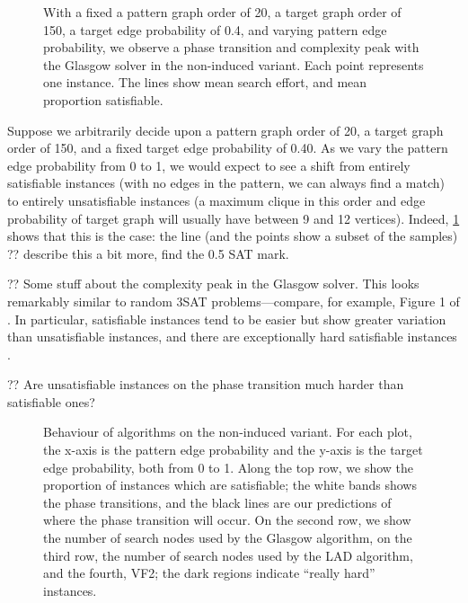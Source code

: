 \documentclass[letterpaper]{article}
\begin{document}
\begin{figure}[tb]
    \setlength{\abovecaptionskip}{6pt}
    
    \caption{With a fixed a pattern graph order of 20, a target graph order of 150, a target edge
        probability of 0.4, and varying pattern edge probability, we observe a phase transition and
        complexity peak with the Glasgow solver in the non-induced variant. Each point represents
        one instance. The lines show mean search effort, and mean proportion satisfiable.}
    \label{figure:phase-transition}
\end{figure}

Suppose we arbitrarily decide upon a pattern graph order of 20, a target graph order of 150, and a
fixed target edge probability of 0.40. As we vary the pattern edge probability from 0 to 1, we would
expect to see a shift from entirely satisfiable instances (with no edges in the pattern, we can
always find a match) to entirely unsatisfiable instances (a maximum clique in this order and edge
probability of target graph will usually have between 9 and 12 vertices). Indeed,
\cref{figure:phase-transition} shows that this is the case: the line (and the points show a subset
of the samples) ?? describe this a bit more, find the 0.5 SAT mark.

?? Some stuff about the complexity peak in the Glasgow solver. This looks remarkably similar to random
3SAT problems---compare, for example, Figure 1 of \citet{LeytonBrown:2014}. In particular,
satisfiable instances tend to be easier but show greater variation than unsatisfiable instances, and
there are exceptionally hard satisfiable instances \citep{Smith:1997}.

?? Are unsatisfiable instances on the phase transition much harder than satisfiable ones?

\begin{figure}[tb]
    \setlength{\abovecaptionskip}{0pt}
    
    \caption{Behaviour of algorithms on the non-induced variant. For each plot, the x-axis is the
        pattern edge probability and the y-axis is the target edge probability, both from 0 to 1.
        Along the top row, we show the proportion of instances which are satisfiable; the white
        bands shows the phase transitions, and the black lines are our predictions of where the
        phase transition will occur. On the second row, we show the number of search nodes used by the
        Glasgow algorithm, on the third row, the number of search nodes used by the LAD algorithm, and the
        fourth, VF2; the dark regions indicate ``really hard'' instances.}
    \label{figure:non-induced}
\end{figure}
\end{document}
